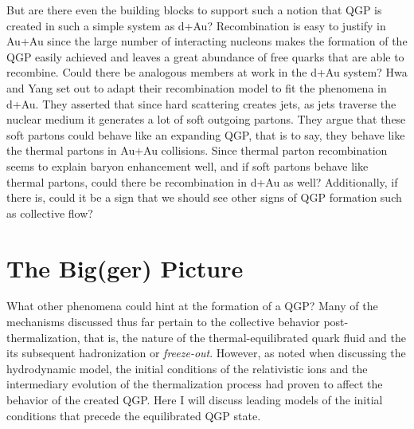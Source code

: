 But are there even the building blocks to support such a notion that QGP is created in such a simple system as d+Au? Recombination is easy to justify in Au+Au since the large number of interacting nucleons makes the formation of the QGP easily achieved and leaves a great abundance of free quarks that are able to recombine. Could there be analogous members at work in the d+Au system? 
Hwa and Yang set out to adapt their recombination model to fit the phenomena in d+Au\citep{PhysRevLett.93.082302}. They asserted that since hard scattering creates jets, as jets traverse the nuclear medium it generates a lot of soft outgoing partons. They argue that these soft partons could behave like an expanding QGP, that is to say, they behave like the thermal partons in Au+Au collisions. Since thermal parton recombination seems to explain baryon enhancement well, and if soft partons behave like thermal partons, could there be recombination in d+Au as well? Additionally, if there is, could it be a sign that we should see other signs of QGP formation such as collective flow? 

\section{The Big(ger) Picture}
What other phenomena could hint at the formation of a QGP? Many of the mechanisms discussed thus far pertain to the collective behavior post-thermalization, that is, the nature of the thermal-equilibrated quark fluid and the its subsequent hadronization or \textit{freeze-out}. However, as noted when discussing the hydrodynamic model, the initial conditions of the relativistic ions and the intermediary evolution of the thermalization process had proven to affect the behavior of the created QGP. Here I will discuss leading models of the initial conditions that precede the equilibrated QGP state.

